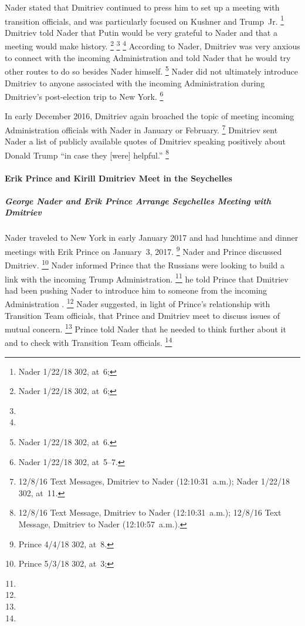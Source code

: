 Nader stated that Dmitriev continued to press him to set up a meeting with transition officials, and was particularly focused on Kushner and Trump~Jr.%
\footnote{Nader 1/22/18 302, at~6;
}
Dmitriev told Nader that Putin would be very grateful to Nader and that a meeting would make history.%
\footnote{Nader 1/22/18 302, at~6;
}
\footnote{}
\footnote{}
According to Nader, Dmitriev was very anxious to connect with the incoming Administration and told Nader that he would try other routes to do so besides Nader himself.%
\footnote{Nader 1/22/18 302, at~6.}
Nader did not ultimately introduce Dmitriev to anyone associated with the incoming Administration during Dmitriev's post-election trip to New York.%
\footnote{Nader 1/22/18 302, at~5--7.}

In early December 2016, Dmitriev again broached the topic of meeting incoming Administration officials with Nader in January or February.%
\footnote{12/8/16 Text Messages, Dmitriev to Nader (12:10:31~a.m.);
Nader 1/22/18 302, at~11.}
Dmitriev sent Nader a list of publicly available quotes of Dmitriev speaking positively about Donald Trump ``in case they [were] helpful.''%
\footnote{12/8/16 Text Message, Dmitriev to Nader (12:10:31~a.m.);
12/8/16 Text Message, Dmitriev to Nader (12:10:57~a.m.).}

\paragraph{Erik Prince and Kirill Dmitriev Meet in the Seychelles}

\subparagraph{George Nader and Erik Prince Arrange Seychelles Meeting with Dmitriev}

Nader traveled to New York in early January 2017 and had lunchtime and dinner meetings with Erik Prince on January~3, 2017.%
\footnote{Prince 4/4/18 302, at~8.}
Nader and Prince discussed Dmitriev.%
\footnote{Prince 5/3/18 302, at~3; }
Nader informed Prince that the Russians were looking to build a link with the incoming Trump Administration.%
\footnote{}
he told Prince that Dmitriev had been pushing Nader to introduce him to someone from the incoming Administration
.%
\footnote{}
Nader suggested, in light of Prince's relationship with Transition Team officials, that Prince and Dmitriev meet to discuss issues of mutual concern.%
\footnote{}
Prince told Nader that he needed to think further about it and to check with Transition Team officials.%
\footnote{}

